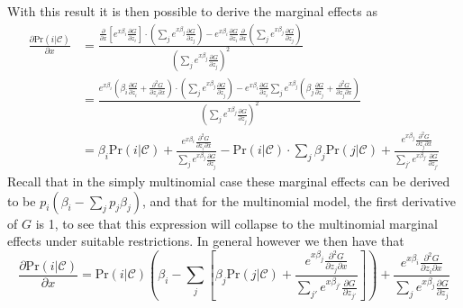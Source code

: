 With this result it is then possible to derive the marginal effects as
\begin{equation}
  \begin{split}
    \frac{\partial \textrm{Pr}(i|\mathcal{C})}{\partial x} &=
    \frac{
    \frac{\partial}{\partial x} \left[
        e^{x\beta_i}\frac{\partial G}{\partial z_i}
      \right]\cdot \left( \sum_j e^{x\beta_j} \frac{\partial G}{\partial z_j} \right) -
      e^{x\beta_i} \frac{\partial G}{\partial z_i} \frac{\partial}{\partial x}\left(
      \sum_j e^{x\beta_j} \frac{\partial G}{\partial z_j}
      \right)
    }{\left( \sum_j e^{x\beta_j} \frac{\partial G}{\partial z_j} \right)^2}
    \\
    &=
    \frac{
     e^{
     x\beta_i} \left(\beta_i \frac{\partial G}{\partial z_i} + \frac{\partial^2 G}{\partial z_i \partial x} \right)
     \cdot \left(\sum_j e^{x\beta_j} \frac{\partial G}{\partial z_j} \right)
     -
     e^{x\beta_i} \frac{\partial G}{\partial z_i} \sum_j  e^{x\beta_j} \left(\beta_j\frac{\partial G}{\partial z_j} + \frac{\partial^2 G}{\partial z_j \partial x} \right)
    }{\left( \sum_j e^{x\beta_j} \frac{\partial G}{\partial z_j} \right)^2}
    \\
    &= \beta_i \textrm{Pr}(i|\mathcal{C}) + \frac{e^{x\beta_i} \frac{\partial^2 G}{\partial z_i \partial x}}{\sum_j e^{x\beta_j} \frac{\partial G}{\partial z_j}}
    - \textrm{Pr}(i|\mathcal{C}) \cdot \sum_j \beta_j \textrm{Pr}(j|\mathcal{C})
    + \frac{e^{x\beta_j} \frac{\partial^2 G}{\partial z_j \partial x}}{\sum_{j'} e^{x\beta_{j'}} \frac{\partial G}{\partial z_{j'}}}
  \end{split}
\end{equation}
Recall that in the simply multinomial case these marginal effects can be derived to be $p_{i}\left(\beta_i - \sum_j p_j \beta_j \right)$, and that for the multinomial model, the first derivative of $G$ is 1, to see that this expression will collapse to the multinomial marginal effects under suitable restrictions. In general however we then have that
\begin{equation} \label{eq: marginaleffects}
    \frac{\partial \textrm{Pr}(i|\mathcal{C})}{\partial x} =
    \textrm{Pr}(i|\mathcal{C}) \left(
    \beta_i - \sum_j  \left[\beta_j \textrm{Pr}(j | \mathcal{C})  + \frac{e^{x\beta_j} \frac{\partial^2 G}{\partial z_j \partial x}}{\sum_{j'} e^{x\beta_{j'}} \frac{\partial G}{\partial z_{j'}}}  \right]    \right) +  \frac{e^{x\beta_i} \frac{\partial^2 G}{\partial z_i \partial x}}{\sum_j e^{x\beta_j} \frac{\partial G}{\partial z_j}}
\end{equation}

